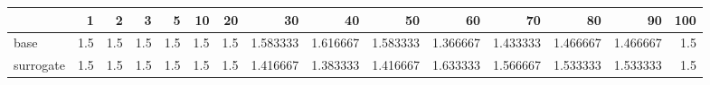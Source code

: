 \begin{tabular}{lrrrrrrrrrrrrrr}
\toprule
{} &  1   &  2   &  3   &  5   &  10  &  20  &       30  &       40  &       50  &       60  &       70  &       80  &       90  &  100 \\
\midrule
base      &  1.5 &  1.5 &  1.5 &  1.5 &  1.5 &  1.5 &  1.583333 &  1.616667 &  1.583333 &  1.366667 &  1.433333 &  1.466667 &  1.466667 &  1.5 \\
surrogate &  1.5 &  1.5 &  1.5 &  1.5 &  1.5 &  1.5 &  1.416667 &  1.383333 &  1.416667 &  1.633333 &  1.566667 &  1.533333 &  1.533333 &  1.5 \\
\bottomrule
\end{tabular}
